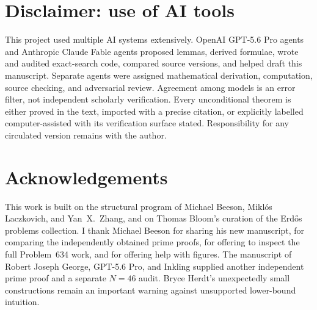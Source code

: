 \documentclass[11pt]{amsart}
\theoremstyle{definition}
\theoremstyle{remark}
\begin{document}
\section*{Disclaimer: use of AI tools}

This project used multiple AI systems extensively.  OpenAI GPT-5.6 Pro agents
and Anthropic Claude Fable agents proposed lemmas, derived formulae, wrote and
audited exact-search code, compared source versions, and helped draft this
manuscript.  Separate agents were assigned mathematical derivation,
computation, source checking, and adversarial review.  Agreement among models
is an error filter, not independent scholarly verification.  Every
unconditional theorem is either proved in the text, imported with a precise
citation, or explicitly labelled computer-assisted with its verification
surface stated.  Responsibility for any circulated version remains with the
author.

\section*{Acknowledgements}

This work is built on the structural program of Michael Beeson, Mikl\'os
Laczkovich, and Yan~X.~Zhang, and on Thomas Bloom's curation of the Erd\H{o}s
problems collection.  I thank Michael Beeson for sharing his new manuscript,
for comparing the independently obtained prime proofs, for offering to inspect
the full Problem~634 work, and for offering help with figures.  The manuscript
of Robert Joseph George, GPT-5.6 Pro, and Inkling supplied another independent
prime proof and a separate $N=46$ audit.  Bryce Herdt's unexpectedly small
constructions remain an important warning against unsupported lower-bound
intuition.
\end{document}
